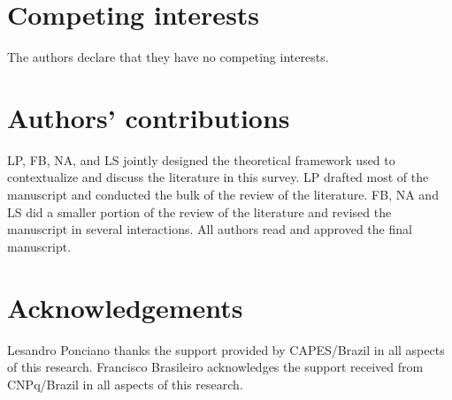 \documentclass[11pt]{bmc_article_s50}
\begin{document}
\section*{Competing interests}

The authors declare that they have no competing interests.\vspace*{-5pt} 

\section*{Authors' contributions}

LP, FB, NA, and LS jointly designed the theoretical framework used to contextualize and discuss the literature in this survey. LP drafted most of the manuscript and conducted the bulk of the review of the literature. FB, NA and LS did a smaller portion of the review of the literature and revised the manuscript in several interactions. All authors read and approved the final manuscript.\vspace*{-5pt} 

\section*{Acknowledgements}

Lesandro Ponciano thanks the support provided by CAPES/Brazil in all aspects of this research. Francisco Brasileiro acknowledges the support received from CNPq/Brazil in all aspects of this research.
\end{document}
